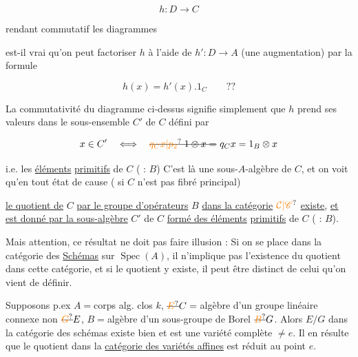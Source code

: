 \[
h:D\longrightarrow C
\]

rendant commutatif les diagrammes




est-il vrai qu'on peut factoriser $h$  à l'aide de $h':D\to A$ (une augmentation)  par la formule

\[
h(x)=h'(x).1_C\qquad ??
\]

La commutativité du diagramme ci-dessus signifie simplement que $h$ prend ses valeurs dans le sous-ensemble $C'$ de $C$  défini par

\[
x\in C'\quad\Longleftrightarrow\quad\deleted{\unsure{q_C x|p_2}\;1\otimes x=}\ q_C x=1_B\otimes x
\]

i.e. les \uline{éléments}  \uline{primitifs} de $C$ ( : $B$) C'est là une sous-$A$-algèbre de $C$, et on voit qu'en tout état de cause ( si $C$ n'est pas fibré principal)

\uline{le quotient de} $C$ \uline{par le groupe d'opérateurs} $B$ \uline{dans la catégorie} $\unsure{\mathcal{C}|\mathscr{C}}$ \uline{existe}, \uline{et est donné par la sous-algèbre} $C'$ de $C$ \uline{formé des éléments}   \uline{primitifs} de $C$ ( : $B$).



Mais attention, ce résultat ne doit pas faire illusion : Si on se place dans la catégorie des \uline{Schémas} sur $\operatorname{Spec}(A)$, il n'implique pas l'existence du quotient dans cette catégorie,  et si le quotient y existe, il peut être distinct de celui qu'on vient de définir.

Supposons p.ex $A={}$corps alg. clos $k$, $\deleted{\unsure{E}}C={}$algèbre  d'un groupe linéaire connexe non  $\deleted{\unsure{G}}E$, $B={}$algèbre d'un sous-groupe de Borel $\deleted{\unsure{B}}G$. Alors $E/G$ dans la catégorie des schémas existe bien et est une variété complète $\ne e$. Il en résulte que le quotient dans la \uline{catégorie des variétés affines} est réduit au point $e$.

